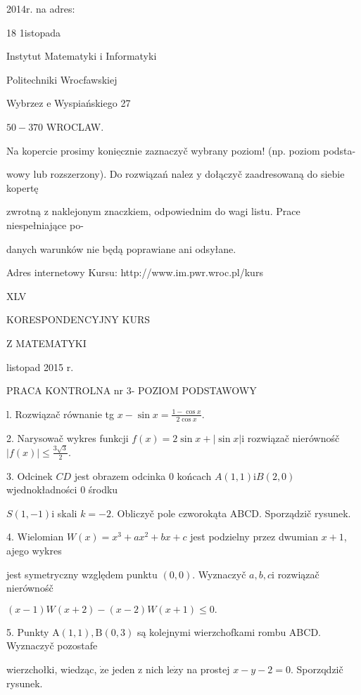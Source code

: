 \documentclass[a4paper,12pt]{article}
\begin{document}
2014r. na adres:

18 1istopada

Instytut Matematyki $\mathrm{i}$ Informatyki

Politechniki Wrocfawskiej

Wybrzez $\mathrm{e}$ Wyspiańskiego 27

$50-370$ WROCLAW.

Na kopercie prosimy $\underline{\mathrm{k}\mathrm{o}\mathrm{n}\mathrm{i}\mathrm{e}\mathrm{c}\mathrm{z}\mathrm{n}\mathrm{i}\mathrm{e}}$ zaznaczyč wybrany poziom! (np. poziom podsta-

wowy lub rozszerzony). Do rozwiązań nalez $\mathrm{y}$ dołączyč zaadresowaną do siebie kopertę

zwrotną $\mathrm{z}$ naklejonym znaczkiem, odpowiednim do wagi listu. Prace niespełniające po-

danych warunków nie będą poprawiane ani odsyłane.

Adres internetowy Kursu: http://www.im.pwr.wroc.pl/kurs







XLV

KORESPONDENCYJNY KURS

Z MATEMATYKI

listopad 2015 r.

PRACA KONTROLNA nr 3- POZIOM PODSTAWOWY

l. Rozwiązač równanie tg $x-\displaystyle \sin x=\frac{1-\cos x}{2\cos x}.$

2. Narysowač wykres funkcji $f(x)=2\sin x+|\sin x|\mathrm{i}$ rozwiązač nierównośč $|f(x)|\displaystyle \leq\frac{3\sqrt{3}}{2}.$

3. Odcinek $CD$ jest obrazem odcinka $0$ końcach $A(1,1)\mathrm{i}B(2,0)$ wjednokładności $0$ środku

$S(1,-1)\mathrm{i}$ skali $k=-2$. Obliczyč pole czworokąta ABCD. Sporządzič rysunek.

4. Wielomian $W(x)=x^{3}+ax^{2}+bx+c$ jest podzielny przez dwumian $x+1$, ajego wykres

jest symetryczny względem punktu $(0,0)$. Wyznaczyč $a, b, c\mathrm{i}$ rozwiązač nierównośč

$(x-1)W(x+2)-(x-2)W(x+1)\leq 0.$

5. Punkty $\mathrm{A}(1,1), \mathrm{B}(0,3)$ są kolejnymi wierzchofkami rombu ABCD. Wyznaczyč pozostafe

wierzchołki, wiedząc, $\dot{\mathrm{z}}\mathrm{e}$ jeden $\mathrm{z}$ nich $\mathrm{l}\mathrm{e}\dot{\mathrm{z}}\mathrm{y}$ na prostej $x-y-2=0$. Sporzqdzič rysunek.
\end{document}
